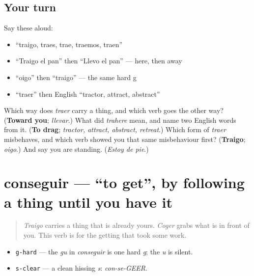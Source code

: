 \subsection*{Your turn}
Say these aloud:

\begin{itemize}
\raggedright
  \item \textquotedblleft{}traigo, traes, trae, traemos, traen\textquotedblright{}
  \item \textquotedblleft{}Traigo el pan\textquotedblright{} then \textquotedblleft{}Llevo el pan\textquotedblright{} — here, then away
  \item \textquotedblleft{}oigo\textquotedblright{} then \textquotedblleft{}traigo\textquotedblright{} — the same hard g
  \item \textquotedblleft{}traer\textquotedblright{} then English \textquotedblleft{}tractor, attract, abstract\textquotedblright{}
\end{itemize}

\begin{tcolorbox}[breakable,colback=teal!4,colframe=teal!35!black,title={Before you move on}]
Which way does \emph{traer} carry a thing, and which verb goes the other way? (\textbf{Toward you}; \emph{llevar}.) What did \emph{trahere} mean, and name two English words from it. (\textbf{To drag}; \emph{tractor, attract, abstract, retreat}.) Which form of \emph{traer} misbehaves, and which verb showed you that same misbehaviour first? (\textbf{Traigo}; \emph{oigo}.) And say you are standing. (\emph{Estoy de pie}.)
\end{tcolorbox}
\section[conseguir]{conseguir — \textquotedblleft{}to get\textquotedblright{}, by following a thing until you have it}

\label{lesson:ES-C39-conseguir}



\begin{quote}
\emph{Traigo} carries a thing that is already yours. \emph{Coger} grabs what is in front of you. This verb is for the getting that took some work.
\end{quote}

\begin{sounds}
\begin{itemize}
\raggedright
  \item \texttt{g-hard} — the \emph{gu} in \emph{conseguir} is one hard \emph{g}; the \emph{u} is silent.
  \item \texttt{s-clear} — a clean hissing \emph{s}: \emph{con-se-GEER}.
\end{itemize}
\end{sounds}

